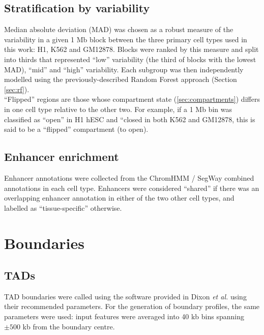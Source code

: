 \documentclass[a4paper]{report}
\begin{document}
\subsection{Stratification by variability}
Median absolute deviation (MAD) was chosen as a robust measure of the
variability in a given 1 Mb block between the three primary cell types
used in this work: H1, K562 and GM12878. Blocks were ranked by this
measure and split into thirds that represented ``low'' variability
(the third of blocks with the lowest MAD), ``mid'' and ``high''
variability. Each subgroup was then independently modelled using the previously-described 
Random Forest approach (Section \ref{sec:rf}). \\

``Flipped'' regions are those whose compartment state
(\ref{sec:compartments}) differs in one cell type relative to the
other two. For example, if a 1 Mb bin was classified as ``open'' in H1
hESC and ``closed in both K562 and GM12878, this is said to be a
``flipped'' compartment (to open). 

\subsection{Enhancer enrichment}
Enhancer annotations were collected from the ChromHMM / SegWay
combined annotations in each cell type.\cite{Hoffman2013} Enhancers
were considered ``shared'' if there was an overlapping enhancer
annotation in either of the two other cell types, and labelled as
``tissue-specific'' otherwise. 

\section{Boundaries}
\subsection{TADs}
TAD boundaries were called using the software provided in Dixon
\emph{et al.}\citep{Dixon2012} using their recommended parameters. For
the generation of boundary profiles, the same parameters were used:
input features were averaged into 40 kb bins spanning $\pm500$ kb from
the boundary centre.
\end{document}
